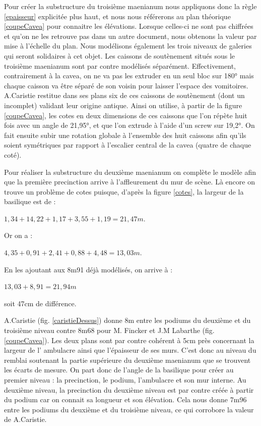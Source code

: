 Pour créer la substructure du troisième \gls{maenianum} nous appliquons donc la règle \ref{epaisseur} explicitée plus haut, et nous nous référerons au plan théorique \ref{coupeCavea} pour connaitre les élévations. Lorsque celles-ci ne sont pas chiffrées et qu'on ne les retrouve pas dans un autre document, nous obtenons la valeur par mise à l'échelle du plan. Nous modélisons également les trois niveaux de galeries qui seront solidaires à cet objet. Les caissons de soutènement situés sous le troisième \gls{maenianum} sont par contre modélisés séparément. Effectivement, contrairement à la \gls{cavea}, on ne va pas les extruder en un seul bloc sur 180° mais chaque caisson va être séparé de son voisin pour laisser l'espace des vomitoires. A.Caristie restitue dans ses plans six de ces caissons de soutènement (dont un incomplet) validant leur origine antique. Ainsi on utilise, à partir de la figure \ref{coupeCavea}, les cotes en deux dimensions de ces caissons que l'on répète huit fois avec un angle de 21,95°, et que l'on extrude à l'aide d'un \gls{screw} sur 19,2°. On fait ensuite subir une rotation globale à l'ensemble des huit caissons afin qu'ils soient symétriques par rapport à l'escalier central de la \gls{cavea} (quatre de chaque coté). 

Pour réaliser la substructure du deuxième \gls{maenianum} on complète le modèle afin que la première \gls{precinction} arrive à l'affleurement du mur de scène. Là encore on trouve un problème de cotes puisque, d'après la figure \ref{cotes}, la largeur de la basilique est de :
\begin{center}
$1,34+14,22+1,17+3,55+1,19=21,47m$.
\end{center}
Or on a : 
\begin{center}
$4,35+0,91+2,41+0,88+4,48=13,03m$.
\end{center}
En les ajoutant aux 8m91 déjà modélisés, on arrive à :
\begin{center}
$13,03+8,91=21,94m$
\end{center}
soit 47cm de différence. 


A.Caristie (fig. \ref{caristieDessus}) donne 8m entre les  \glspl{podium} du deuxième et du troisième niveau contre 8m68 pour M. Fincker et J.M Labarthe (fig. \ref{coupeCavea}). Les deux plans sont par contre cohérent à 5cm près concernant la largeur de l' \gls{ambulacre} ainsi que l'épaisseur de ses murs. C'est donc au niveau du remblai soutenant la partie supérieure du deuxième \gls{maenianum} que se trouvent les écarts de mesure. On part donc de l'angle de la basilique pour créer au premier niveau : la \gls{precinction}, le \gls{podium}, l'\gls{ambulacre} et son mur interne. Au deuxième niveau, la \gls{precinction} du deuxième niveau est par contre créée à partir du  \gls{podium} car on connait sa longueur et son élévation. Cela nous donne 7m96 entre les \glspl{podium} du deuxième et du troisième niveau, ce qui corrobore la valeur de A.Caristie.

